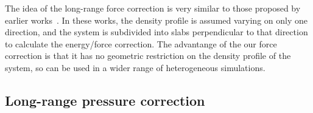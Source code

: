 \documentclass[aps,pre,preprint]{revtex4}
\renewcommand{\v}[1]{\textbf{\textit{#1}}}
\begin{document}
The idea of the long-range force correction is very similar to those
proposed by earlier works~\cite{guo1997long, mecke1997molecular,
  janecek2006long, shen2007comparative}. In these works, the density
profile is assumed varying on only one direction, and the system is
subdivided into slabs perpendicular to that direction to calculate the
energy/force correction. The advantange of the our force correction is
that it has no geometric restriction on the density profile of the
system, so can be used in a wider range of heterogeneous simulations.





\subsection{Long-range pressure correction}

\end{document}
